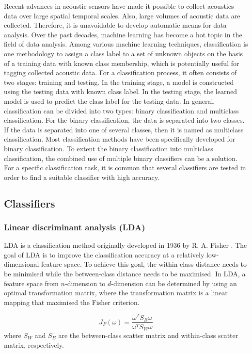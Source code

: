 Recent advances in acoustic sensors have made it possible to collect acoustics data over large spatial temporal scales. Also, large volumes of acoustic data are collected. Therefore, it is unavoidable to develop automatic means for data analysis. Over the past decades, machine learning has become a hot topic in the field of data analysis. Among various machine learning techniques, classification is one methodology to assign a class label to a set of unknown objects on the basis of a training data with known class membership, which is potentially useful for tagging collected acoustic data. For a classification process, it often consists of two stages: training and testing. In the training stage, a model is constructed using the testing data with known class label. In the testing stage, the learned model is used to predict the class label for the testing data. In general, classification can be divided into two types: binary classification and multiclass classification. For the binary classification, the data is separated into two classes. If the data is separated into one of several classes, then it is named as multiclass classification. Most classification methods have been specifically developed for binary classification. To extent the binary classification into multiclass classification, the combined use of multiple binary classifiers can be a solution.  For a specific classification task, it is common that several classifiers are tested in order to find a suitable classifier with high accuracy. 

\subsection{Classifiers}

\subsubsection{Linear discriminant analysis (LDA)}
LDA is a classification method originally developed in 1936 by R. A. Fisher \citep{fisher1936use}. The goal of LDA is to improve the classification accuracy at a relatively low-dimensional feature space. To achieve this goal, the within-class distance needs to be minimised while the between-class distance needs to be maximised. In LDA, a feature space from $n$-dimension to $d$-dimension can be determined by using an optimal transformation matrix, where the transformation matrix is a linear mapping that maximised the Fisher criterion.

\begin{equation}
J_{F}(\omega)=\frac{\omega^{T}S_{B}\omega}{\omega^{T}S_{W}\omega}
\end{equation}
where $S_{W}$ and $S_{B}$ are the between-class scatter matrix and within-class scatter matrix, respectively.

